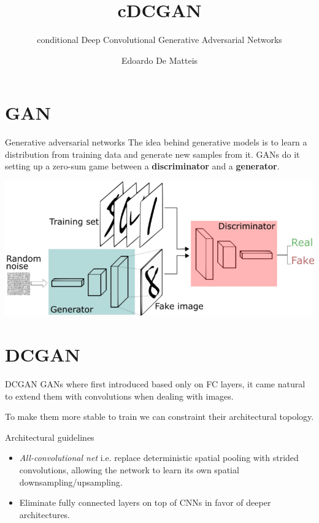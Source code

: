 \documentclass{beamer}
\title{cDCGAN}
\subtitle{conditional Deep Convolutional Generative Adversarial Networks}
\author{Edoardo De Matteis}
\date{}
\institute[La Sapienza University of Rome]
\begin{document}
\frame{\titlepage}

\section{GAN}

\begin{frame}{Generative adversarial networks}
    The idea behind generative models is to learn a distribution from training data and generate new samples from it.
    GANs do it setting up a zero-sum game between a \textbf{discriminator} and a \textbf{generator}.
\end{frame}

\begin{frame}
    \centering
    \includegraphics[scale=0.35]{images/gan-scheme-rand.png}
\end{frame}

\section{DCGAN}
\begin{frame}{DCGAN}
    GANs where first introduced based only on FC layers, it came natural to extend them with convolutions when dealing with images.

    To make them more stable to train we can constraint their architectural topology.
\end{frame}

\begin{frame}{Architectural guidelines}
    \begin{itemize}
        \item \textit{All-convolutional net} i.e. replace deterministic spatial pooling with strided convolutions, allowing the network to learn its own spatial downsampling/upsampling.
        \item Eliminate fully connected layers on top of CNNs in favor of deeper architectures.
    \end{itemize}
\end{frame}
\end{document}

